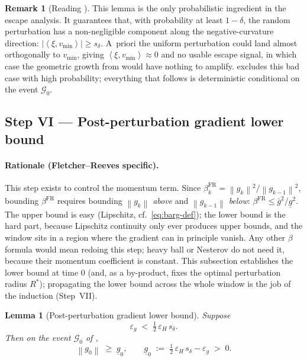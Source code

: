 \documentclass[11pt,a4paper]{article}
\theoremstyle{plain}
\newtheorem{lemma}{Lemma}
\theoremstyle{definition}
\newtheorem{remark}{Remark}
\newcommand{\norm}[1]{\left\|#1\right\|}
\newcommand{\inner}[2]{\left\langle #1,#2 \right\rangle}
\newcommand{\eps}{\varepsilon}
\newcommand{\epsg}{\eps_{g}}
\newcommand{\epsH}{\eps_{H}}
\newcommand{\vmin}{v_{\min}}
\newcommand{\sdel}{s_{\delta}}
\newcommand{\glow}{\underline{g}}
\newcommand{\Rstar}{R^{*}}
\newcommand{\gup}{\bar g}
\begin{document}
\begin{remark}[Reading ]
This lemma is the only probabilistic ingredient in the escape analysis.
It guarantees that, with probability at least $1-\delta$, the random
perturbation has a non-negligible component along the negative-curvature
direction: $|\inner{\xi}{\vmin}|\ge\sdel$. A~priori the uniform
perturbation could land almost orthogonally to $\vmin$, giving
$\inner{\xi}{\vmin}\approx 0$ and no usable escape signal, in which case
the geometric growth from  would have nothing to
amplify.  excludes this bad case with high
probability; everything that follows is deterministic conditional on the
event $\mathcal{G}_{0}$.
\end{remark}

\subsection{Step VI --- Post-perturbation gradient lower bound}\label{sub:gfloor}

\paragraph{Rationale (Fletcher--Reeves specific).}
This step exists to control the momentum term. Since
$\beta^{\mathrm{FR}}_{k} = \norm{g_{k}}^{2}/\norm{g_{k-1}}^{2}$, bounding
$\beta^{\mathrm{FR}}$ requires bounding $\norm{g_{k}}$ \emph{above} and
$\norm{g_{k-1}}$ \emph{below}:
$\beta^{\mathrm{FR}} \le \gup^{2}/\glow^{2}$. The upper bound is easy
(Lipschitz, cf.~\eqref{eq:barg-def}); the lower bound is the hard part, because
Lipschitz continuity only ever produces upper bounds, and the window sits in a
region where the gradient can in principle vanish. Any other $\beta$ formula
would mean redoing this step; heavy ball or Nesterov do not need it, because
their momentum coefficient is constant. This subsection establishes the lower
bound at time $0$ (and, as a by-product, fixes the optimal perturbation radius
$\Rstar$); propagating the lower bound across the whole window is the job of the
induction (Step~VII).

\begin{lemma}[Post-perturbation gradient lower bound]\label{lem:gfloor0}
Suppose
\begin{equation}\label{eq:smallness-snap}
\epsg \;<\; \tfrac{1}{2}\,\epsH\,\sdel.
\end{equation}
Then on the event $\mathcal{G}_{0}$ of ,
\[
\norm{g_{0}} \;\ge\; \glow_{0},
\qquad
\glow_{0} \;:=\; \tfrac{1}{2}\,\epsH\,\sdel - \epsg \;>\; 0.
\]
\end{lemma}
\end{document}
